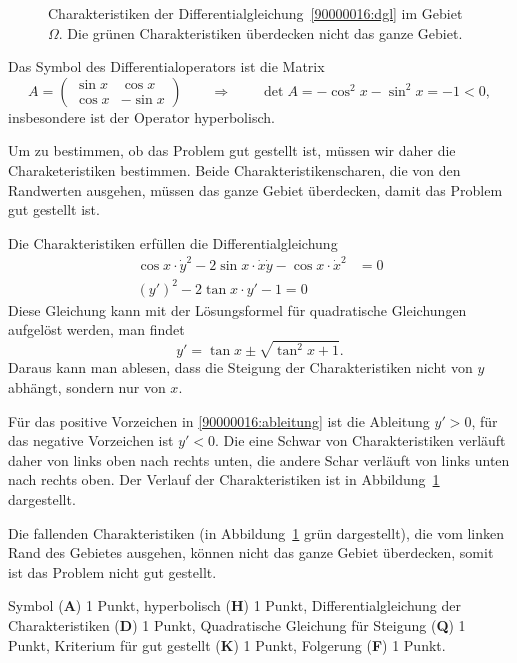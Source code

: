 \begin{loesung}
\begin{figure}
\centering
{}
\caption{Charakteristiken der Differentialgleichung~\eqref{90000016:dgl}
im Gebiet $\Omega$.
Die grünen Charakteristiken überdecken nicht das ganze Gebiet.
\label{90000016:char}}
\end{figure}
Das Symbol des Differentialoperators  ist die Matrix
\[
A
=
\begin{pmatrix} \sin x & \cos x\\ \cos x & -\sin x \end{pmatrix}
\qquad\Rightarrow\qquad
\det A
=
-\cos^2 x -\sin^2 x = -1 < 0,
\]
insbesondere ist der Operator hyperbolisch.

Um zu bestimmen, ob das Problem gut gestellt ist, müssen wir daher die
Charaketeristiken bestimmen.
Beide Charakteristikenscharen, die von den Randwerten ausgehen, müssen das
ganze Gebiet überdecken, damit das Problem gut gestellt ist.

Die Charakteristiken erfüllen die Differentialgleichung
\begin{align*}
\cos x \cdot \dot y^2
-
2\sin x\cdot \dot x \dot y
-
\cos x \cdot \dot x^2
&=
0
\\
(y')^2
-2\tan x\cdot y'
-1
=
0
\end{align*}
Diese Gleichung kann mit der Lösungsformel für quadratische Gleichungen
aufgelöst werden, man findet
\begin{equation}
y' = \tan x\pm \sqrt{\tan^2 x+1}.
\label{90000016:ableitung}
\end{equation}
Daraus kann man ablesen, dass die Steigung der Charakteristiken nicht von
$y$ abhängt, sondern nur von $x$.

Für das positive Vorzeichen in \eqref{90000016:ableitung} ist die
Ableitung $y' > 0$, für das negative Vorzeichen ist $y'<0$.
Die eine Schwar von Charakteristiken verläuft daher von links oben
nach rechts unten, die andere Schar verläuft von links unten nach
rechts oben.
Der Verlauf der Charakteristiken ist in Abbildung~\ref{90000016:char}
dargestellt.

Die fallenden Charakteristiken (in Abbildung~\ref{90000016:char} grün
dargestellt), die vom linken Rand des Gebietes
ausgehen, können nicht das ganze Gebiet überdecken, somit ist das
Problem nicht gut gestellt.
\end{loesung}

\begin{bewertung}
Symbol ({\bf A}) 1 Punkt,
hyperbolisch ({\bf H}) 1 Punkt,
Differentialgleichung der Charakteristiken ({\bf D}) 1 Punkt,
Quadratische Gleichung für Steigung ({\bf Q}) 1 Punkt,
Kriterium für gut gestellt ({\bf K}) 1 Punkt,
Folgerung ({\bf F}) 1 Punkt.
\end{bewertung}

